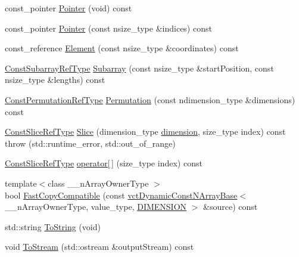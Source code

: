 \begin{DoxyCompactItemize}
\item 
const\-\_\-pointer \hyperlink{classvct_dynamic_const_n_array_base_a25569e83166416c770ce27ab110b3da9}{Pointer} (void) const 
\item 
const\-\_\-pointer \hyperlink{classvct_dynamic_const_n_array_base_a14f9fc2a054cb06b3143badafaa387e7}{Pointer} (const nsize\-\_\-type \&indices) const 
\item 
const\-\_\-reference \hyperlink{classvct_dynamic_const_n_array_base_afcc2aa2aaeb25a94e1e52c218ce5be87}{Element} (const nsize\-\_\-type \&coordinates) const 
\item 
\hyperlink{classvct_dynamic_const_n_array_base_a4b3508630e409eda4f0d2f55d17d89a4}{Const\-Subarray\-Ref\-Type} \hyperlink{classvct_dynamic_const_n_array_base_a8a88c0496fccecdb88a773cc5d0bef84}{Subarray} (const nsize\-\_\-type \&start\-Position, const nsize\-\_\-type \&lengths) const 
\item 
\hyperlink{classvct_dynamic_const_n_array_base_a412fcb88d50ea2e1d809efab113968fc}{Const\-Permutation\-Ref\-Type} \hyperlink{classvct_dynamic_const_n_array_base_a3fd5e02305f664b17e54231ca78b8da2}{Permutation} (const ndimension\-\_\-type \&dimensions) const 
\item 
\hyperlink{classvct_dynamic_const_n_array_base_ad4a09eb0789ba4c5b8d799fbe0ee3d79}{Const\-Slice\-Ref\-Type} \hyperlink{classvct_dynamic_const_n_array_base_a095e5f16394b59310987eac507bf6e16}{Slice} (dimension\-\_\-type \hyperlink{classvct_dynamic_const_n_array_base_aad976ad48dc9b1006d9e2729195f0b7c}{dimension}, size\-\_\-type index) const   throw (std\-::runtime\-\_\-error, std\-::out\-\_\-of\-\_\-range)
\item 
\hyperlink{classvct_dynamic_const_n_array_base_ad4a09eb0789ba4c5b8d799fbe0ee3d79}{Const\-Slice\-Ref\-Type} \hyperlink{classvct_dynamic_const_n_array_base_ab6d97ba698b824cd14c35bce8c39a561}{operator\mbox{[}$\,$\mbox{]}} (size\-\_\-type index) const 
\item 
{\footnotesize template$<$class \-\_\-\-\_\-n\-Array\-Owner\-Type $>$ }\\bool \hyperlink{classvct_dynamic_const_n_array_base_a324d0b47c36b576a0cdcdbaa0c279934}{Fast\-Copy\-Compatible} (const \hyperlink{classvct_dynamic_const_n_array_base}{vct\-Dynamic\-Const\-N\-Array\-Base}$<$ \-\_\-\-\_\-n\-Array\-Owner\-Type, value\-\_\-type, \hyperlink{classvct_dynamic_const_n_array_base_a815ac316ebc1bb2ab1969d307549826faf759c9ab831ff929b89af4ea2865a378}{D\-I\-M\-E\-N\-S\-I\-O\-N} $>$ \&source) const 
\item 
std\-::string \hyperlink{classvct_dynamic_const_n_array_base_ad656498d357917484f821278322895bb}{To\-String} (void)
\item 
void \hyperlink{classvct_dynamic_const_n_array_base_a091d2040dff2016a444a169554dfda2c}{To\-Stream} (std\-::ostream \&output\-Stream) const 
\end{DoxyCompactItemize}
